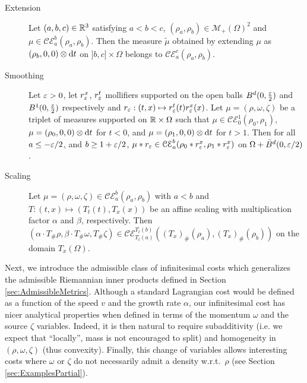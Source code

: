 \begin{proposition}
\label{prop:results on continuity equation}
\hfill
\begin{description}
\item[Extension] Let $(a,b,c) \in \mathbb{R}^3$ satisfying $a<b<c$, $(\rho_a,\rho_b) \in \mathcal{M}_+(\Omega)^2$ and $\mu \in \mathcal{CE}_a^b(\rho_a,\rho_b)$. Then the measure $\tilde{\mu}$ obtained by extending $\mu$ as $(\rho_b , 0, 0)\otimes \mathrm{d} t$ on $]b,c]\times \Omega$ belongs to $\mathcal{CE}_a^c(\rho_a,\rho_b)$.
%
\item[Smoothing] Let $\varepsilon>0$, let $r^x_{\varepsilon}$, $r^t_\varepsilon$ mollifiers supported on the open balls $B^d(0,\frac{\varepsilon}{2})$ and $B^1(0,\frac{\varepsilon}{2})$ respectively and $r_{\varepsilon} : (t,x) \mapsto r_{\varepsilon}^t(t)r_{\varepsilon}^x(x)$. Let $\mu = (\rho,\omega,\zeta)$ be a triplet of measures supported on $\mathbb{R}\times \Omega$ such that $\mu \in \mathcal{CE}_0^1(\rho_0,\rho_1)$, $\mu = (\rho_0,0,0)\otimes \mathrm{d} t$ for $t<0$, and $\mu = (\rho_1,0,0)\otimes \mathrm{d} t$ for $t>1$. Then for all $a\leq-\varepsilon/2$, and $b\geq1+\varepsilon/2$, $\mu \ast r_\varepsilon \in \mathcal{CE}_a^b(\rho_0 \ast r_\varepsilon^x,\rho_1 \ast r_\varepsilon^x)$ on $\Omega+ \bar{B}^d(0,\varepsilon/2)$.
%
\item[Scaling] Let $\mu = (\rho,\omega,\zeta) \in \mathcal{CE}_a^b(\rho_a,\rho_b)$ with $a<b$ and $T : (t,x) \mapsto (T_t(t), T_x(x))$ be an affine scaling with multiplication factor $\alpha$ and $\beta$, respectively. Then $(\alpha \cdot T_\#\rho, \beta \cdot T_\# \omega,  T_\#\zeta) \in \mathcal{CE}_{T_t(a)}^{T_t(b)}((T_x)_\#(\rho_a),(T_x)_\#(\rho_b))$ on the domain $T_x(\Omega)$.
\end{description}
\end{proposition}



%
Next, we introduce the admissible class of infinitesimal costs which generalizes the admissible Riemannian inner products defined in Section \ref{sec:AdmissibleMetrics}. Although a standard Lagrangian cost would be defined as a function of the speed $v$ and the growth rate $\alpha$, our infinitesimal cost has nicer analytical properties when defined in terms of the momentum $\omega$ and the source $\zeta$ variables. Indeed, it is then natural to require subadditivity (i.e. we expect that ``locally'', mass is not encouraged to split) and homogeneity in $(\rho,\omega,\zeta)$ (thus convexity). Finally, this change of variables allows interesting costs where $\omega$ or $\zeta$ do not necessarily admit a density w.r.t.\ $\rho$ (see Section \ref{sec:ExamplesPartial}).

